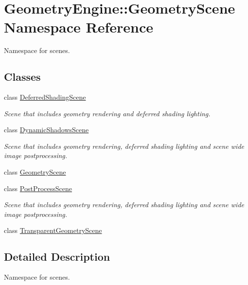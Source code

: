 \hypertarget{namespace_geometry_engine_1_1_geometry_scene}{}\section{Geometry\+Engine\+::Geometry\+Scene Namespace Reference}
\label{namespace_geometry_engine_1_1_geometry_scene}


Namespace for scenes.  


\subsection*{Classes}
\begin{DoxyCompactItemize}
\item 
class \mbox{\hyperlink{class_geometry_engine_1_1_geometry_scene_1_1_deferred_shading_scene}{Deferred\+Shading\+Scene}}
\begin{DoxyCompactList}\small\item\em Scene that includes geometry rendering and deferred shading lighting. \end{DoxyCompactList}\item 
class \mbox{\hyperlink{class_geometry_engine_1_1_geometry_scene_1_1_dynamic_shadows_scene}{Dynamic\+Shadows\+Scene}}
\begin{DoxyCompactList}\small\item\em Scene that includes geometry rendering, deferred shading lighting and scene wide image postprocessing. \end{DoxyCompactList}\item 
class \mbox{\hyperlink{class_geometry_engine_1_1_geometry_scene_1_1_geometry_scene}{Geometry\+Scene}}
\item 
class \mbox{\hyperlink{class_geometry_engine_1_1_geometry_scene_1_1_post_process_scene}{Post\+Process\+Scene}}
\begin{DoxyCompactList}\small\item\em Scene that includes geometry rendering, deferred shading lighting and scene wide image postprocessing. \end{DoxyCompactList}\item 
class \mbox{\hyperlink{class_geometry_engine_1_1_geometry_scene_1_1_transparent_geometry_scene}{Transparent\+Geometry\+Scene}}
\end{DoxyCompactItemize}


\subsection{Detailed Description}
Namespace for scenes. 
